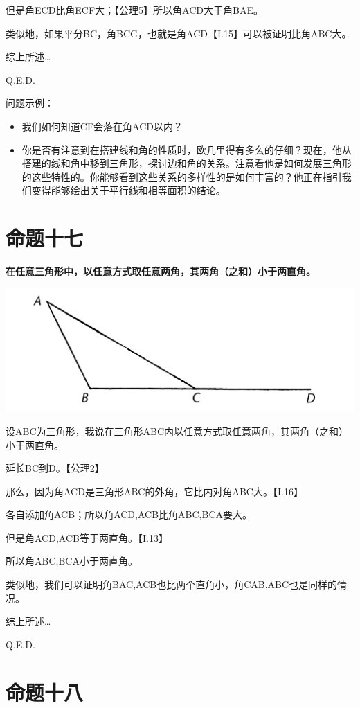 \documentclass[
]{book}
\providecommand{\tightlist}{%
  \setlength{\itemsep}{0pt}\setlength{\parskip}{0pt}}
\begin{document}
但是角ECD比角ECF大；【公理5】所以角ACD大于角BAE。

类似地，如果平分BC，角BCG，也就是角ACD【I.15】可以被证明比角ABC大。

综上所述\ldots{}

Q.E.D.

问题示例：

\begin{itemize}
\tightlist
\item
  我们如何知道CF会落在角ACD以内？
\item
  你是否有注意到在搭建线和角的性质时，欧几里得有多么的仔细？现在，他从搭建的线和角中移到三角形，探讨边和角的关系。注意看他是如何发展三角形的这些特性的。你能够看到这些关系的多样性的是如何丰富的？他正在指引我们变得能够绘出关于平行线和相等面积的结论。
\end{itemize}

\hypertarget{ux547dux9898ux5341ux4e03}{%
\section{命题十七}\label{ux547dux9898ux5341ux4e03}}

\textbf{在任意三角形中，以任意方式取任意两角，其两角（之和）小于两直角。}

\includegraphics[width=0.5\linewidth]{./image/img483}

设ABC为三角形，我说在三角形ABC内以任意方式取任意两角，其两角（之和）小于两直角。

延长BC到D。【公理2】

那么，因为角ACD是三角形ABC的外角，它比内对角ABC大。【I.16】

各自添加角ACB；所以角ACD,ACB比角ABC,BCA要大。

但是角ACD,ACB等于两直角。【I.13】

所以角ABC,BCA小于两直角。

类似地，我们可以证明角BAC,ACB也比两个直角小，角CAB,ABC也是同样的情况。

综上所述\ldots{}

Q.E.D.

\hypertarget{ux547dux9898ux5341ux516b}{%
\section{命题十八}\label{ux547dux9898ux5341ux516b}}
\end{document}
